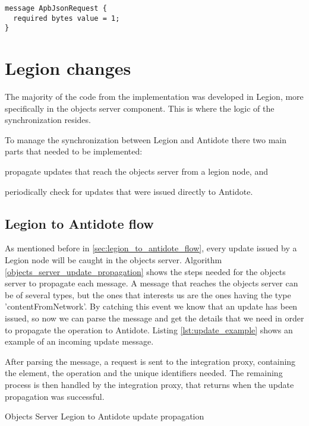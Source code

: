 \begin{lstlisting}[caption={Protocol Buffer interface methods after},label={lst:proto2}]
message ApbJsonRequest {
  required bytes value = 1;
}
\end{lstlisting}

\section{Legion changes}
\label{sec:legion_changes}
The majority of the code from the implementation was developed in Legion, more specifically in the objects server component. This is where the logic of the synchronization resides.\par
	To manage the synchronization between Legion and Antidote there two main parts that needed to be implemented: 
\begin{enumerate*}[(i)]
\item propagate updates that reach the objects server from a legion node, and 
\item periodically check for updates that were issued directly to Antidote.
\end{enumerate*}

\subsection{Legion to Antidote flow}
\label{sec:legion_changes_legion_to_antidote_flow}
As mentioned before in \ref{sec:legion_to_antidote_flow}, every update issued by a Legion node will be caught in the objects server. Algorithm \ref{objects_server_update_propagation} shows the steps needed for the objects server to propagate each message. A message that reaches the objects server can be of several types, but the ones that interests us are the ones having the type 'contentFromNetwork'. By catching this event we know that an update has been issued, so now we can parse the message and get the details that we need in order to propagate the operation to Antidote. Listing \ref{lst:update_example} shows an example of an incoming update message.\par
	After parsing the message, a request is sent to the integration proxy, containing the element, the operation and the unique identifiers needed. The remaining process is then handled by the integration proxy, that returns when the update propagation was successful.
	
\begin{algorithm}
\caption{Objects Server Legion to Antidote update propagation}\label{objects_server_update_propagation}
\begin{algorithmic}[1]
      \End
  \EndIf
\End
\end{algorithmic}
\end{algorithm}
	

